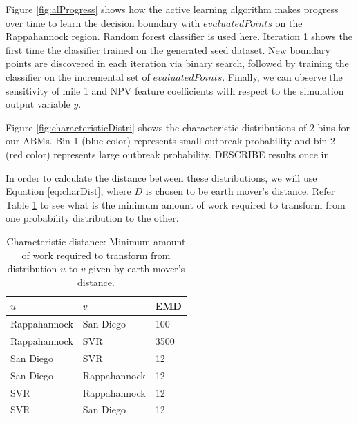 Figure \ref{fig:alProgress} shows how the active learning algorithm makes progress over time to learn the decision boundary with $evaluatedPoints$ on the Rappahannock region. Random forest classifier is used here. Iteration 1 shows the first time the classifier trained on the generated seed dataset. New boundary points are discovered in each iteration via binary search, followed by training the classifier on the incremental set of $evaluatedPoints$. Finally, we can observe the sensitivity of mile 1 and NPV feature coefficients with respect to the simulation output variable $y$.




Figure \ref{fig:characteristicDistri} shows the characteristic distributions of 2 bins for our ABMs. 
Bin 1 (blue color) represents small outbreak probability and bin 2 (red color) represents large outbreak probability. {\color{magenta}DESCRIBE results once in }

In order to calculate the distance between these distributions, we will use Equation \ref{eq:charDist}, where $D$ is chosen to be earth mover’s distance. Refer Table \ref{tab: characterDistancesABM} to see what is the minimum amount of work required to transform from one probability distribution to the other.

\begin{table}[H]
	\centering
	\caption{Characteristic distance: Minimum amount of work required to transform from distribution $u$ to $v$ given by earth mover's distance.}
	\begin{tabular}{|l|l|l|}
		\hline
		{\bf $u$} & {\bf $v$} & {\bf EMD} \\ 
		\hline
		Rappahannock & San Diego & 100 \\ 
		\hline
		Rappahannock & SVR & 3500 \\ 
		\hline
		San Diego & SVR & 12  \\ 
		\hline
		San Diego & Rappahannock & 12  \\ 
		\hline
		SVR & Rappahannock & 12  \\ 
		\hline
		SVR & San Diego & 12  \\ 
		\hline
	\end{tabular}
	\label{tab: characterDistancesABM}
\end{table}	





